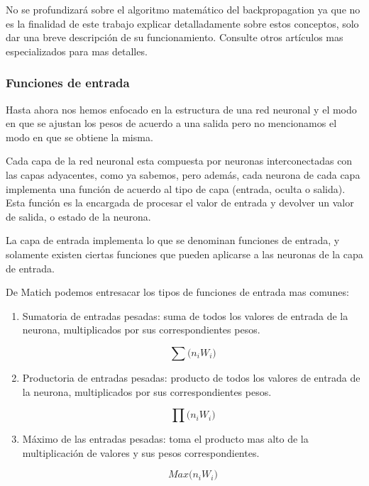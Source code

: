 \documentclass[a4paper,12pt,oneside,spanish]{book}
\begin{document}
No se profundizará sobre el algoritmo matemático del backpropagation ya que no es la finalidad de este trabajo explicar detalladamente sobre estos conceptos, solo dar una breve descripción de su funcionamiento. Consulte otros artículos mas especializados para mas detalles.\par

\subsubsection{Funciones de entrada}
Hasta ahora nos hemos enfocado en la estructura de una red neuronal y el modo en que se ajustan los pesos de acuerdo a una salida pero no mencionamos el modo en que se obtiene la misma.\par

Cada capa de la red neuronal esta compuesta por neuronas interconectadas con las capas adyacentes, como ya sabemos, pero además, cada neurona de cada capa implementa una función de acuerdo al tipo de capa (entrada, oculta o salida). Esta función es la encargada de procesar el valor de entrada y devolver un valor de salida, o estado de la neurona.\par

La capa de entrada implementa lo que se denominan funciones de entrada, y solamente existen ciertas funciones que pueden aplicarse a las neuronas de la capa de entrada.\par 

De Matich \cite{matich} podemos entresacar los tipos de funciones de entrada mas comunes:
\begin{enumerate}
	\baselineskip 16pt
	\item Sumatoria de entradas pesadas: suma de todos los valores de
	entrada de la neurona, multiplicados por sus correspondientes pesos.\par 
	\[\sum \textit{($n_i$$W_i$)} \]
	
	\item Productoria de entradas pesadas: producto de todos los valores de entrada de la neurona, multiplicados por sus correspondientes pesos.\par 
	\[\prod \textit{($n_i$$W_i$)} \]

	\item Máximo de las entradas pesadas: toma el producto mas alto de la multiplicación de valores y sus pesos correspondientes.\par 
	
	\[ \textit{Max($n_i$$W_i$)} \]
\end{enumerate}	\baselineskip 16pt
\end{document}
